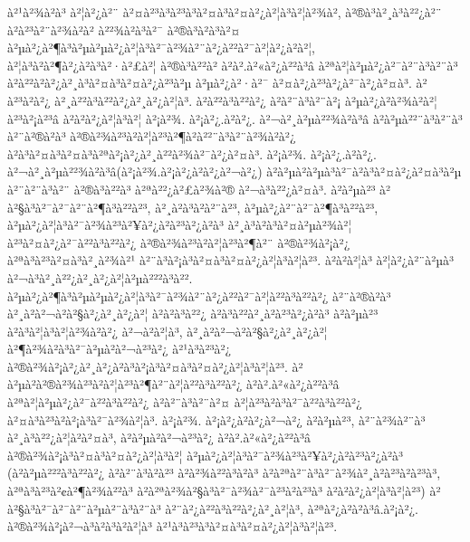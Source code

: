 à²¹à²¾à²à³ à²¦à²¿à²¨ à²¤à²³à³à²³à³à²¤à³à²¤à²¿à²¦à³à²¦à²¾à², à²®à³à²¸à³à²²¿à²¨ à²à²³à²¨à²¾à²à² à²²¾à²à³à²¯ à²®à³à²à³à²¤ à²µà²¿à²¶à³à²µà²µà²¿à²¦à³à²¯à²¾à²¨à²¿à²²à²¯à²¦à²¿à²à²¦, à²¦à³à²\circ à²¶à²¿à²à³à²·à²£à²¦ à²®à³à²²à² à²à².à²«à²¿à²²à³â à²ªà²¦à²µà²¿à²¯à²¨à³à²¨à³ à²à²²à²­à²¿à²¸à³à²¤à³à²¤à²¿à²³à²µ à²µà²¿à²·à²¯ à²¤à²¿à²³à²¿à²¯à²¿à²¤à³. à²à²³à²à²¿ à²¸à²²à³à²²à²¿à²¸à²¿à²¦à³. à²à²²à³à²²à²¿ à²à²¨à³à²¨à²¡ à²µà²¿à²­à²¾à²à²¦ à²³à²¡à²³â à²à²à²¿à²¦à³à²¦ à²¡à²¾. à²¡à²¿.à²à²¿. à²¬à²¸à²µà²²¾à²à³â à²à²µà²²¨à³à²¨à³ à²¨à²®à²à³ à²®à²¾à²³à²à²¦à²³à²¶à²à²²¨à³à²¨à²¾à²à²¿ à²à³à²¤à³à²¤à³à²ªà²¡à²¿à²¸à²²à²¾à²¯à²¿à²¤à³. à²¡à²¾. à²¡à²¿.à²à²¿. à²¬à²¸à²µà²²¾à²à³â(à²¡à²¾.à²¡à²¿à²à²¿à²¬à²¿) à²à²µà²\circ à²µà³à²¯à²à³à²¤à²¿à²¤à³à²µ à²¨à²¨à³à²¨ à²®à³à²²à³ à²ªà²²¿à²£à²¾à²® à²¬à³à²²¿à²¤à³. à²à²µà²³ à²à²§à³à²¯à²¯à²¨à²¶à³à²²à²³, à²¸à²à³à²à²¨à²³, à²µà²¿à²¨à²¯à²¶à³à²²à²³, à²µà²¿à²¦à³à²¯à²¾à²³à²¥à²¿à²à²³à²¿à²à³ à²¸à³à²à³à²¤à²µà²¾à²¦ à²³à²¤à²¿à²¯à²²à³à²²à²¿ à²®à²¾à²³à²à²¦à²³à²¶à²¨ à²®à²¾à²¡à²¿ à²ªà³à²³à²¤à³à²¸à²¾à²¹ à²¨à³à²¡à³à²¤à³à²¤à²¿à²¦à³à²¦à²³. à²à²à²¦à³ à²¦à²¿à²¨à²µà³ à²¬à³à²¸à²²¿à²¸à²¿à²¦à²µà²²²à³à²². à²µà²¿à²¶à³à²µà²µà²¿à²¦à³à²¯à²¾à²¨à²¿à²²à²¯à²¦à²²à³à²²à²¿ à²¨à²®à²à³ à²¸à²à²¬à²à²§à²¿à²¸à²¿à²¦ à²à²à³à²²¿ à²à³à²²à²¸à²à²³à²¿à²à³ à²à²µà²³ à²à³à²¦à³à²¦à²¾à²à²¿ à²¬à²à²¦à³, à²¸à²à²¬à²à²§à²¿à²¸à²¿à²¦ à²¶à²¾à²à³à²¯à²µà²\circ à²¬à²³à²¿ à²¹à³à²³à²¿ à²®à²¾à²¡à²¿à²¸à²¿à²à³à²¡à³à²¤à³à²¤à²¿à²¦à³à²¦à²³. à²à²µà²\circ à²®à²¾à²³à²à²¦à²³à²¶à²¨à²¦à²²à³à²²à²¿ à²à².à²«à²¿à²²à³â à²ªà²¦à²µà²¿à²¯à²²à³à²²à²¿ à²à²¨à³à²¨à²¤ à²¦à²³à²à³à²¯à²²à³à²²à²¿ à²¤à³à²³à²à²¡à³à²¯à²¾à²¦à³. à²¡à²¾. à²¡à²¿à²à²¿à²¬à²¿ à²à²µà²³, à²¨à²¾à²¨à³ à²¸à³à²²¿à²¦à²à²¤à³, à²à²µà²\circ à²¬à²³à²¿ à²à².à²«à²¿à²²à³â à²®à²¾à²¡à³à²¤à³à²¤à²¿à²¦à³à²¦ à²µà²¿à²¦à³à²¯à²¾à²³à²¥à²¿à²à²³à²¿à²à³ (à²à²µà²²²à³à²²à²¿ à²à²¨à³à²à²³ à²à²¾à²²à³à²à³ à²à²ªà²¨à³à²¯à²¾à²¸à²à²³à²à²³à³, à²ªà³à²³à²¢à²¶à²¾à²²à³ à²à²ªà²¾à²§à³à²¯à²¾à²¯à²³à²à²³à³ à²à²à²¿à²¦à³à²¦à²³) à²à²§à³à²¯à²¯à²¨à²µà²¨à³à²¨à³ à²¨à²¿à²²à³à²²à²¿à²¸à²¦à³, à²ªà²¿à²à²à³â.à²¡à²¿. à²®à²¾à²¡à²¬à³à²à³à²à²¦à³ à²¹à³à²³à³à²¤à³à²¤à²¿à²¦à³à²¦à²³.

